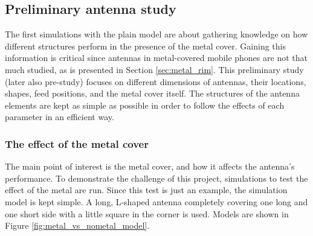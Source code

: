\subsection{Preliminary antenna study}
\label{sec:pre_study}
The first simulations with the plain model are about gathering knowledge on how different structures perform in the presence of the metal cover. Gaining this information is critical since antennas in metal-covered mobile phones are not that much studied, as is presented in Section \ref{sec:metal_rim}. This preliminary study (later also pre-study) focuses on different dimensions of antennas, their locations, shapes, feed positions, and the metal cover itself. The structures of the antenna elements are kept as simple as possible in order to follow the effects of each parameter in an efficient way. 


\subsubsection{The effect of the metal cover}
\label{sec:metal_effect}
The main point of interest is the metal cover, and how it affects the antenna's performance. To demonstrate the challenge of this project, simulations to test the effect of the metal are run. Since this test is just an example, the simulation model is kept simple. A long, L-shaped antenna completely covering one long and one short side with a little square in the corner is used. Models are shown in Figure \ref{fig:metal_vs_nometal_model}.

